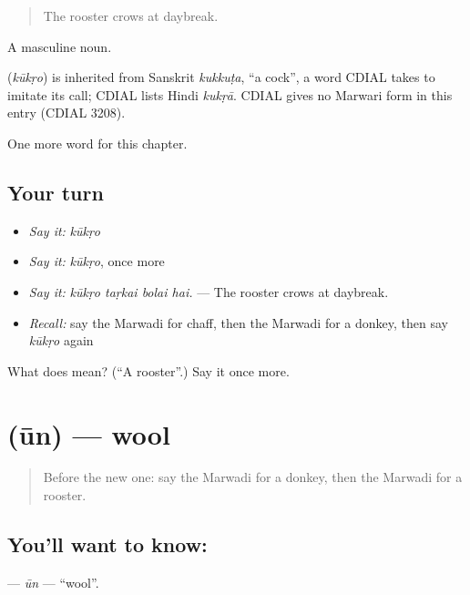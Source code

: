 \begin{quote}
The rooster crows at daybreak.
\end{quote}

A masculine noun.

\begin{cousinweb}
\textbf{} (\emph{kūkṛo}) is inherited from Sanskrit \emph{kukkuṭa}, \textquotedblleft{}a cock\textquotedblright{}, a word CDIAL takes to imitate its call; CDIAL lists Hindi \emph{kukṛā}. CDIAL gives no Marwari form in this entry (CDIAL 3208).
\end{cousinweb}

\begin{grammarlens}[title={What you've built}]
One more word for this chapter.
\end{grammarlens}

\subsection*{Your turn}
\begin{itemize}
\raggedright
  \item \emph{Say it:} \emph{kūkṛo}
  \item \emph{Say it:} \emph{kūkṛo}, once more
  \item \emph{Say it:} \emph{kūkṛo taṛkai bolai hai.} — The rooster crows at daybreak.
  \item \emph{Recall:} say the Marwadi for chaff, then the Marwadi for a donkey, then say \emph{kūkṛo} again
\end{itemize}

\begin{tcolorbox}[breakable,colback=teal!4,colframe=teal!35!black,title={Before you move on}]
What does  mean? (\textquotedblleft{}A rooster\textquotedblright{}.) Say it once more.
\end{tcolorbox}
\section[\texorpdfstring{\mw{ऊन} (ūn)}{ऊन (ūn)}]{ (ūn) — wool}

\label{lesson:MW-C236-un}



\begin{quote}
Before the new one: say the Marwadi for a donkey, then the Marwadi for a rooster.
\end{quote}

\subsection*{You'll want to know: }
\textbf{} — \emph{ūn} — \textquotedblleft{}wool\textquotedblright{}.

